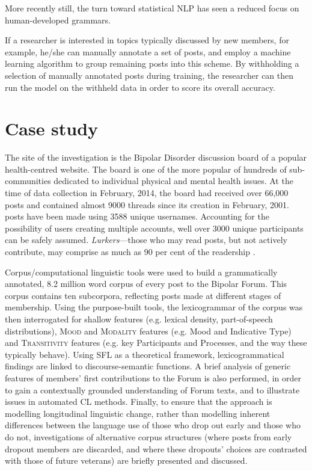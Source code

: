 \documentclass{article}
\renewcommand{\cite}{\parencite}
\begin{document}
More recently still, the turn toward statistical NLP has seen a reduced focus on human-developed grammars.

If a researcher is interested in topics typically discussed by new members, for example, he\slash she can manually annotate a set of posts, and employ a machine learning algorithm to group remaining posts into this scheme. By withholding a selection of manually annotated posts during training, the researcher can then run the model on the withheld data in order to score its overall accuracy.

\section{Case study}

The site of the investigation is the Bipolar Disorder discussion board of a popular health-centred website. The board is one of the more popular of hundreds of sub-communities dedicated to individual physical and mental health issues. At the time of data collection in February, 2014, the board had received over 66,000 posts and contained almost 9000 threads since its creation in February, 2001. posts have been made using 3588 unique usernames. Accounting for the possibility of users creating multiple accounts, well over 3000 unique participants can be safely assumed. \emph{Lurkers}---those who may read posts, but not actively contribute, may comprise as much as 90 per cent of the readership \cite{preece_top_2004}.

Corpus\slash computational linguistic tools were used to build a grammatically annotated, 8.2 million word corpus of every post to the Bipolar Forum. This corpus contains ten subcorpora, reflecting posts made at different stages of membership. Using the purpose-built tools, the lexicogrammar of the corpus was then interrogated for shallow features (e.g. lexical density, part-of-speech distributions), \textsc{Mood} and \textsc{Modality} features (e.g. Mood and Indicative Type) and \textsc{Transitivity} features (e.g. key Participants and Processes, and the way these typically behave). Using SFL as a theoretical framework, lexicogrammatical findings are linked to discourse-semantic functions. A brief analysis of generic features of members' first contributions to the Forum is also performed, in order to gain a contextually grounded understanding of Forum texts, and to illustrate issues in automated CL methods. Finally, to ensure that the approach is modelling longitudinal linguistic change, rather than modelling inherent differences between the language use of those who drop out early and those who do not, investigations of alternative corpus structures (where posts from early dropout members are discarded, and where these dropouts' choices are contrasted with those of future veterans) are briefly presented and discussed.
\end{document}
